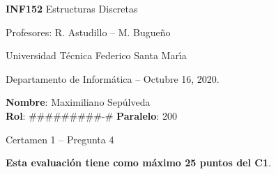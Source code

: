 \documentclass[legalpaper,10pt]{article}
\begin{document}
\thispagestyle{empty}

\begin{minipage}[t]{0.6\textwidth}

{\LARGE \textbf{INF152} Estructuras Discretas}

{\large Profesores: R. Astudillo -- M. Bugueño}

Universidad Técnica Federico Santa Mar\'{\i}a

Departamento de Informática -- Octubre 16, 2020.

\end{minipage}
\hfill
\begin{minipage}[t]{0.35\textwidth}
\textbf{Nombre}: Maximiliano Sepúlveda\\[0.3cm]
\textbf{Rol}: #########-# \textbf{Paralelo}: 200
\end{minipage}

\vspace{0.8cm}

{\Large Certamen 1 -- Pregunta 4}

\vspace{0.4cm}

\textbf{Esta evaluación tiene como máximo 25 puntos del C1}.
\end{document}
